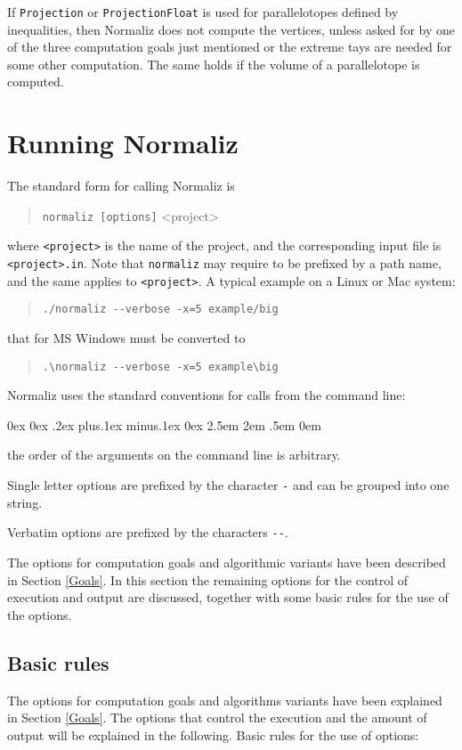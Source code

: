 \documentclass[12pt,a4paper]{scrartcl}
\newcounter{listi}
\newcommand{\stdli}{ \topsep0ex \partopsep0ex %
\parsep.2ex plus.1ex minus.1ex \itemsep0ex%
\leftmargin2.5em \labelwidth2em \labelsep.5em \rightmargin0em}%
\newenvironment{arab}{\begin{list}{\textup{(\arabic{listi})}}%
	{\usecounter{listi}\stdli}}{\end{list}}
\theoremstyle{definition}
\begin{document}
If \verb|Projection| or \verb|ProjectionFloat| is used for parallelotopes defined by inequalities, then Normaliz does not compute the vertices, unless asked for by one of the three computation goals just mentioned or the extreme tays are needed for some other computation. The same holds if the volume of a parallelotope is computed.
\section{Running Normaliz}\label{options}

The standard form for  calling Normaliz is
\begin{quote}
	\verb|normaliz [options]| <project>
\end{quote}
where \verb|<project>| is the name of the project, and the corresponding input file is \verb|<project>.in|. Note that \verb|normaliz| may require to be prefixed by a path name, and the same applies to \verb|<project>|. A typical example on a Linux or Mac system:
\begin{quote}
	\verb|./normaliz --verbose -x=5 example/big|
\end{quote}
that for MS Windows must be converted to
\begin{quote}
	\verb|.\normaliz --verbose -x=5 example\big|
\end{quote}

Normaliz uses the standard conventions for calls from the command line:
\begin{arab}
	\item the order of the arguments on the command line is arbitrary.
	\item Single letter options are prefixed by the character \verb|-| and can be grouped into one string.
	\item Verbatim options are prefixed by the characters \verb|--|.
\end{arab}

The options for computation goals and algorithmic variants have been described in Section \ref{Goals}. In this section the remaining options for the control of execution and output are discussed, together with some basic rules for the use of the options.

\subsection{Basic rules}
The options for computation goals and algorithms variants have been explained in Section \ref{Goals}. The options that control the execution and the amount of output will be explained in the following. Basic rules for the use of options:
\end{document}
